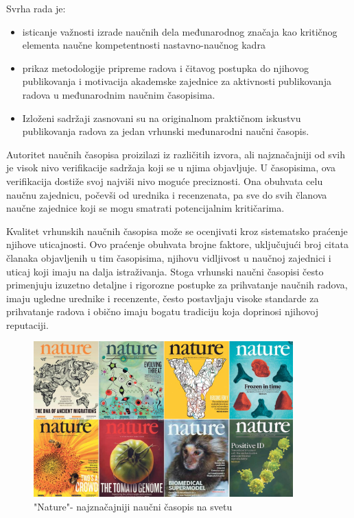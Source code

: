 \documentclass[12pt,a4paper]{article}
\begin{document}
     Svrha rada je: 
    \begin{itemize}
        \item isticanje važnosti izrade naučnih dela međunarodnog značaja kao kritičnog elementa naučne kompetentnosti nastavno-naučnog kadra
        \item prikaz metodologije pripreme radova i čitavog postupka do njihovog publikovanja i motivacija akademske zajednice za aktivnosti publikovanja radova u međunarodnim naučnim časopisima.
        \item Izloženi sadržaji zasnovani su na originalnom praktičnom iskustvu publikovanja radova za jedan vrhunski međunarodni naučni časopis.
    \end{itemize}    
    \qquad 

    Autoritet naučnih časopisa proizilazi iz različitih izvora, ali najznačajniji od svih je visok nivo verifikacije sadržaja koji se u njima objavljuje. U časopisima, ova verifikacija dostiže svoj najviši nivo moguće preciznosti. Ona obuhvata celu naučnu zajednicu, počevši od urednika i recenzenata, pa sve do svih članova naučne zajednice koji se mogu smatrati potencijalnim kritičarima.

    Kvalitet vrhunskih naučnih časopisa može se ocenjivati kroz sistematsko praćenje njihove uticajnosti. Ovo praćenje obuhvata brojne faktore, uključujući broj citata članaka objavljenih u tim časopisima, njihovu vidljivost u naučnoj zajednici i uticaj koji imaju na dalja istraživanja. Stoga vrhunski naučni časopisi često primenjuju izuzetno detaljne i rigorozne postupke za prihvatanje naučnih radova, imaju ugledne urednike i recenzente, često postavljaju visoke standarde za prihvatanje radova i obično imaju bogatu tradiciju koja doprinosi njihovoj reputaciji.\cite{2}
        
            
        \begin{figure} [h]
        \centering  
        \includegraphics [width=10cm] {nature.png} 
        \caption{"Nature"- najznačajniji naučni časopis na svetu}\label{slika2}
        \end{figure}  
\end{document}
